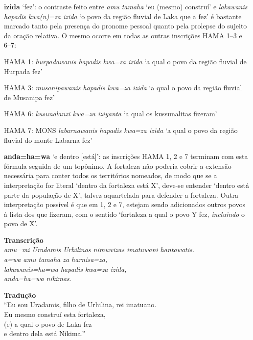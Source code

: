 \noindent\textbf{izida} `fez': o contraste feito entre \emph{amu tamaha} `eu (mesmo)
construí' e \emph{lakawanis hapadis kwa{(n)}=za izida} `o povo da região
fluvial de Laka que a fez' é bastante marcado tanto pela presença do pronome
pessoal quanto pela prolepse do sujeito da oração relativa.
O mesmo ocorre em todas as outras inscrições HAMA 1--3 e 6--7:
\begin{compactitem}
	\item HAMA 1: \emph{hurpadawanis hapadis kwa=za izida} `a qual o povo da região
	fluvial de Hurpada fez'
	\item HAMA 3: \emph{musanipawanis hapadis kwa=za izida} `a qual o povo da região
	fluvial de Musanipa fez'
	\item HAMA 6: \emph{kusunalanzi kwa=za iziyanta} `a qual os kussunalitas fizeram'
	\item HAMA 7: MONS \emph{labarnawanis hapadis kwa=za izida} `a qual o
	povo da região fluvial do monte Labarna fez'
\end{compactitem}

\noindent\textbf{anda=ha=wa} `e dentro [está]': as inscrições HAMA 1, 2 e 7
terminam com esta fórmula seguida de um topônimo.
A fortaleza não poderia cobrir a extensão necessária para conter todos os
territórios nomeados, de modo que se a interpretação for literal `dentro da
fortaleza está X', deve-se entender `dentro está parte da população de X',
talvez aquartelada para defender a fortaleza.
Outra interpretação possível é que em 1, 2 e 7, estejam sendo adicionados outros
povos à lista dos que fizeram, com o sentido `fortaleza a qual o povo Y fez,
\emph{incluindo} o povo de X'.


\begin{flushleft}
	\noindent \textbf{Transcrição}\\
	\noindent [1] \emph{amu=mi Uradamis Urhilinas nimuwizas imatuwani hantawatis.}\\
	\noindent [2] \emph{a=wa amu \mbox{tamaha} za harnisa=za,}\\
	\noindent [3] \emph{lakawanis=ha=wa hapadis kwa=za izida,}\\
	\noindent [4] \emph{anda=ha=wa \mbox{nikimas}.}


	\noindent \textbf{Tradução}\\
	\noindent [1] ``Eu sou Uradamis, filho de Urhilina, rei imatuano.\\
	\noindent [2] Eu mesmo construí esta fortaleza,\\
	\noindent [3] (e) a qual o povo de Laka fez\\
	\noindent [4] e dentro dela está Nikima.''
\end{flushleft}


